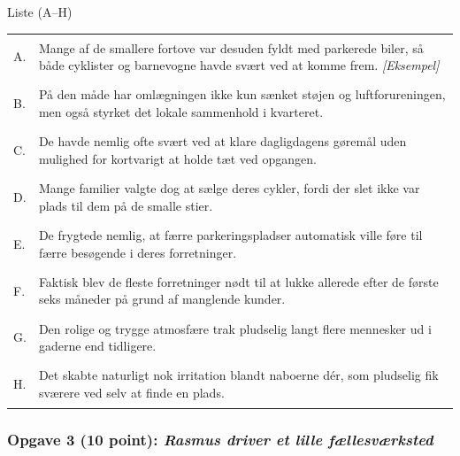 \begin{grammatikbox}{Liste (A--H)}
\small
\renewcommand{\arraystretch}{1.28}
\begin{tabularx}{\linewidth}{@{} >{\bfseries\color{NCDRed}\raggedright\arraybackslash}p{0.65cm} >{\raggedright\arraybackslash}X @{}}
A. & Mange af de smallere fortove var desuden fyldt med parkerede biler, så både cyklister og barnevogne havde svært ved at komme frem. \textcolor{NCDGray}{\small\textit{[Eksempel]}} \\
B. & På den måde har omlægningen ikke kun sænket støjen og luftforureningen, men også styrket det lokale sammenhold i kvarteret. \\
C. & De havde nemlig ofte svært ved at klare dagligdagens gøremål uden mulighed for kortvarigt at holde tæt ved opgangen. \\
D. & Mange familier valgte dog at sælge deres cykler, fordi der slet ikke var plads til dem på de smalle stier. \\
E. & De frygtede nemlig, at færre parkeringspladser automatisk ville føre til færre besøgende i deres forretninger. \\
F. & Faktisk blev de fleste forretninger nødt til at lukke allerede efter de første seks måneder på grund af manglende kunder. \\
G. & Den rolige og trygge atmosfære trak pludselig langt flere mennesker ud i gaderne end tidligere. \\
H. & Det skabte naturligt nok irritation blandt naboerne dér, som pludselig fik sværere ved selv at finde en plads. \\
\end{tabularx}
\end{grammatikbox}

\subsubsection*{Opgave 3 (10 point): \textit{Rasmus driver et lille fællesværksted}}


